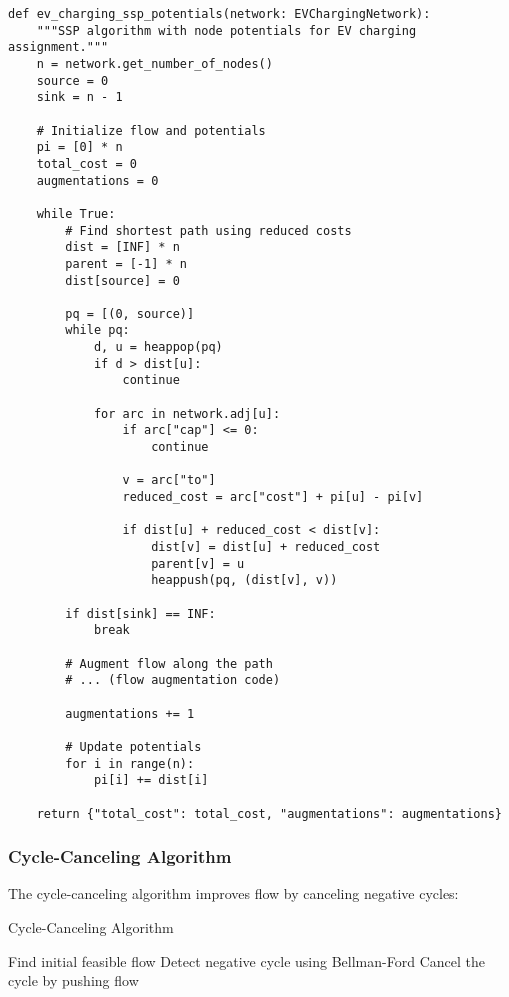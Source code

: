 \documentclass[12pt,a4paper]{article}
\begin{document}
\begin{lstlisting}[caption=SSP Implementation]
def ev_charging_ssp_potentials(network: EVChargingNetwork):
    """SSP algorithm with node potentials for EV charging assignment."""
    n = network.get_number_of_nodes()
    source = 0
    sink = n - 1
    
    # Initialize flow and potentials
    pi = [0] * n
    total_cost = 0
    augmentations = 0
    
    while True:
        # Find shortest path using reduced costs
        dist = [INF] * n
        parent = [-1] * n
        dist[source] = 0
        
        pq = [(0, source)]
        while pq:
            d, u = heappop(pq)
            if d > dist[u]:
                continue
                
            for arc in network.adj[u]:
                if arc["cap"] <= 0:
                    continue
                    
                v = arc["to"]
                reduced_cost = arc["cost"] + pi[u] - pi[v]
                
                if dist[u] + reduced_cost < dist[v]:
                    dist[v] = dist[u] + reduced_cost
                    parent[v] = u
                    heappush(pq, (dist[v], v))
        
        if dist[sink] == INF:
            break
            
        # Augment flow along the path
        # ... (flow augmentation code)
        
        augmentations += 1
        
        # Update potentials
        for i in range(n):
            pi[i] += dist[i]
    
    return {"total_cost": total_cost, "augmentations": augmentations}
\end{lstlisting}

\subsubsection{Cycle-Canceling Algorithm}

The cycle-canceling algorithm improves flow by canceling negative cycles:

\begin{algorithm}[H]
\caption{Cycle-Canceling Algorithm}
\begin{algorithmic}[1]
\STATE Find initial feasible flow
    \STATE Detect negative cycle using Bellman-Ford
    \STATE Cancel the cycle by pushing flow
\ENDWHILE
\end{algorithmic}
\end{algorithm}
\end{document}
